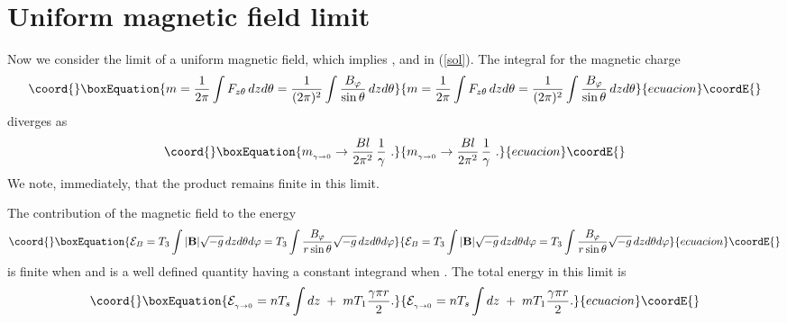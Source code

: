 \documentclass[a4paper,12pt]{article}
\begin{document}
\section{Uniform magnetic field limit}

Now we consider the limit of a uniform magnetic field, which implies \coordHE{}, and \coordHE{} in (\ref{sol}). The integral for the magnetic charge 
\begin{equation}\coord{}\boxEquation{
 m=\frac{1}{2\pi}\int F_{z\theta}\,dzd\theta =\frac{1}{(2\pi )^2}
\int\frac{B_{\varphi}}{\sin\theta}\,dzd\theta
\label{u3}
}{
 m=\frac{1}{2\pi}\int F_{z\theta}\,dzd\theta =\frac{1}{(2\pi )^2}
\int\frac{B_{\varphi}}{\sin\theta}\,dzd\theta
}{ecuacion}\coordE{}\end{equation}
diverges as
\begin{equation}\coord{}\boxEquation{
m_{{}_{\gamma\to 0}}\to\frac{Bl}{2\pi^2}\,\frac{1}{\gamma}\ .
\label{u4}
}{
m_{{}_{\gamma\to 0}}\to\frac{Bl}{2\pi^2}\,\frac{1}{\gamma}\ .
}{ecuacion}\coordE{}\end{equation}
We note, immediately, that the product \coordHE{} remains finite in this limit.

The contribution of the magnetic field to the energy
\begin{equation}\coord{}\boxEquation{
{\cal E}_B=T_3\int |\m |\sqrt{-g}\,dzd\theta d\varphi =
T_3\int \frac{B_{\varphi}}{r\sin\theta}\sqrt{-g}\,dzd\theta d\varphi
\label{u1}
}{
{\cal E}_B=T_3\int |\m |\sqrt{-g}\,dzd\theta d\varphi =
T_3\int \frac{B_{\varphi}}{r\sin\theta}\sqrt{-g}\,dzd\theta d\varphi
}{ecuacion}\coordE{}\end{equation}
is finite when \coordHE{} and is a well defined quantity having a constant integrand when \coordHE{}. The total energy in this limit is
\begin{equation}\coord{}\boxEquation{
{\cal E}_{{}_{\gamma\to 0}}=nT_s\int dz\; +\; mT_1\frac{\gamma\pi r}{2}.
\label{u2}
}{
{\cal E}_{{}_{\gamma\to 0}}=nT_s\int dz\; +\; mT_1\frac{\gamma\pi r}{2}.
}{ecuacion}\coordE{}\end{equation}
\end{document}
